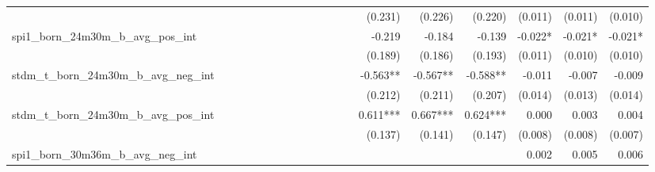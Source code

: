 \begin{tabular}{lrrrrrrrrrrrrrrrrrr}
                                            &              &              &              &              &              &              &              &              &               &              &              &               &      (0.231) &      (0.226) &       (0.220) &      (0.011) &      (0.011) &       (0.010) \\ 
spi1\_born\_24m30m\_b\_avg\_pos\_int        &              &              &              &              &              &              &              &              &               &              &              &               &       -0.219 &       -0.184 &        -0.139 &      -0.022* &      -0.021* &       -0.021* \\ 
                                            &              &              &              &              &              &              &              &              &               &              &              &               &      (0.189) &      (0.186) &       (0.193) &      (0.011) &      (0.010) &       (0.010) \\ 
stdm\_t\_born\_24m30m\_b\_avg\_neg\_int     &              &              &              &              &              &              &              &              &               &              &              &               &     -0.563** &     -0.567** &      -0.588** &       -0.011 &       -0.007 &        -0.009 \\ 
                                            &              &              &              &              &              &              &              &              &               &              &              &               &      (0.212) &      (0.211) &       (0.207) &      (0.014) &      (0.013) &       (0.014) \\ 
stdm\_t\_born\_24m30m\_b\_avg\_pos\_int     &              &              &              &              &              &              &              &              &               &              &              &               &     0.611*** &     0.667*** &      0.624*** &        0.000 &        0.003 &         0.004 \\ 
                                            &              &              &              &              &              &              &              &              &               &              &              &               &      (0.137) &      (0.141) &       (0.147) &      (0.008) &      (0.008) &       (0.007) \\ 
spi1\_born\_30m36m\_b\_avg\_neg\_int        &              &              &              &              &              &              &              &              &               &              &              &               &              &              &               &        0.002 &        0.005 &         0.006 \\ 

\end{tabular}
